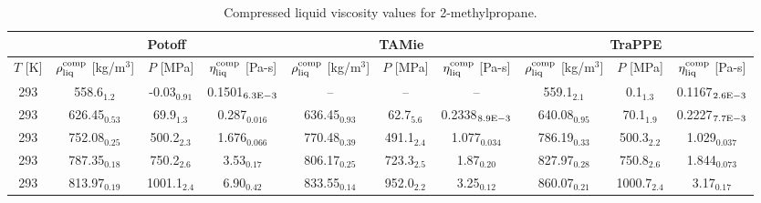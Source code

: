 \documentclass[preprint,review,12pt]{elsarticle}
\begin{document}
\begin{landscape}

	\begin{table}[H]
		\caption{Compressed liquid viscosity values for 2-methylpropane.}
		\begin{center}
			\begin{tabular}{|c|c|c|c|c|c|c|c|c|c|}
				\hline
				& \multicolumn{3}{c|}{Potoff}                                                                          & \multicolumn{3}{c|}{TAMie}                                                                              & \multicolumn{3}{c|}{TraPPE}                                                                          \\ \hline
				$T$ {[}K{]} & $\rho^{\rm comp}_{\rm liq}$ {[}kg/m$^3${]} & $P$ {[}MPa{]}  & $\eta^{\rm comp}_{\rm liq}$ {[}Pa-s{]} & $\rho^{\rm comp}_{\rm liq}$ {[}kg/m$^3${]} & $P$ {[}MPa{]}     & $\eta^{\rm comp}_{\rm liq}$ {[}Pa-s{]} & $\rho^{\rm comp}_{\rm liq}$ {[}kg/m$^3${]} & $P$ {[}MPa{]}  & $\eta^{\rm comp}_{\rm liq}$ {[}Pa-s{]} \\ \hline
				293         & 558.6$_{1.2}$                              & -0.03$_{0.91}$ & 0.1501$_{6.3 \rm E-3}$                      & --                          & -- & --                     & 559.1$_{2.1}$                          & 0.1$_{1.3}$    & 0.1167$_{2.6 \rm E-3}$                      \\ \hline
				293         & 626.45$_{0.53}$                            & 69.9$_{1.3}$   & 0.287$_{0.016}$                        & 636.45$_{0.93}$                         & 62.7$_{5.6}$      & 0.2338$_{8.9 \rm E-3}$                      & 640.08$_{0.95}$                         & 70.1$_{1.9}$   & 0.2227$_{7.7 \rm E-3}$                      \\ \hline
				293         & 752.08$_{0.25}$                            & 500.2$_{2.3}$  & 1.676$_{0.066}$                        & 770.48$_{0.39}$                         & 491.1$_{2.4}$     & 1.077$_{0.034}$                        & 786.19$_{0.33}$                         & 500.3$_{2.2}$  & 1.029$_{0.037}$                        \\ \hline
				293         & 787.35$_{0.18}$                            & 750.2$_{2.6}$  & 3.53$_{0.17}$                          & 806.17$_{0.25}$                         & 723.3$_{2.5}$     & 1.87$_{0.20}$                          & 827.97$_{0.28}$                         & 750.8$_{2.6}$  & 1.844$_{0.073}$                        \\ \hline
				293         & 813.97$_{0.19}$                            & 1001.1$_{2.4}$ & 6.90$_{0.42}$                          & 833.55$_{0.14}$                         & 952.0$_{2.2}$     & 3.25$_{0.12}$                          & 860.07$_{0.21}$                         & 1000.7$_{2.4}$ & 3.17$_{0.17}$                          \\ \hline
			\end{tabular}
		\end{center}
	\end{table}


\end{landscape}
\end{document}
